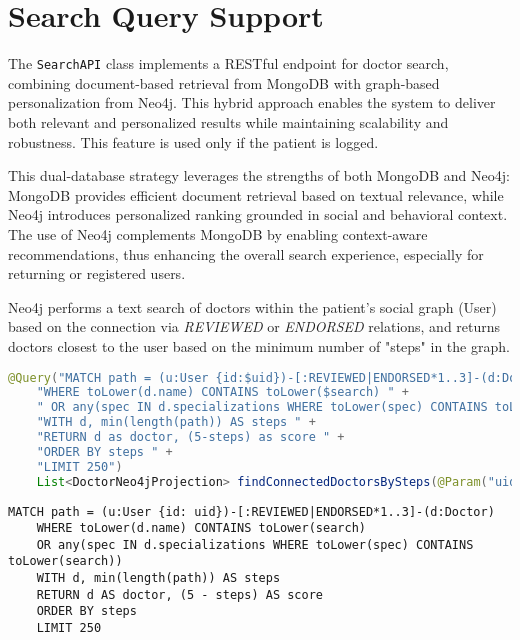 \section{Search Query Support}
The \texttt{SearchAPI} class implements a RESTful endpoint for doctor search, combining document-based retrieval from MongoDB with graph-based personalization from Neo4j. This hybrid approach enables the system to deliver both relevant and personalized results while maintaining scalability and robustness. This feature is used only if the patient is logged. 

This dual-database strategy leverages the strengths of both MongoDB and Neo4j: MongoDB provides efficient document retrieval based on textual relevance, while Neo4j introduces personalized ranking grounded in social and behavioral context. The use of Neo4j complements MongoDB by enabling context-aware recommendations, thus enhancing the overall search experience, especially for returning or registered users. 

Neo4j performs a text search of doctors within the patient's social graph (User) based on the connection via \textit{REVIEWED} or \textit{ENDORSED} relations, and returns doctors closest to the user based on the minimum number of "steps" in the graph.

\begin{lstlisting}[language=java, caption={Java code for the Neo4j Search Query}
	]
	@Query("MATCH path = (u:User {id:$uid})-[:REVIEWED|ENDORSED*1..3]-(d:Doctor) " +
	"WHERE toLower(d.name) CONTAINS toLower($search) " +
	" OR any(spec IN d.specializations WHERE toLower(spec) CONTAINS toLower($search)) " +
	"WITH d, min(length(path)) AS steps " +
	"RETURN d as doctor, (5-steps) as score " +
	"ORDER BY steps " +
	"LIMIT 250")
	List<DoctorNeo4jProjection> findConnectedDoctorsBySteps(@Param("uid") String patientId, @Param("search") String search);
\end{lstlisting}


\begin{lstlisting}[language=cypher, caption={Equivalent Cypher query for Neo4j Search Query}]
	MATCH path = (u:User {id: uid})-[:REVIEWED|ENDORSED*1..3]-(d:Doctor)
	WHERE toLower(d.name) CONTAINS toLower(search)
	OR any(spec IN d.specializations WHERE toLower(spec) CONTAINS toLower(search))
	WITH d, min(length(path)) AS steps
	RETURN d AS doctor, (5 - steps) AS score
	ORDER BY steps
	LIMIT 250
\end{lstlisting}

